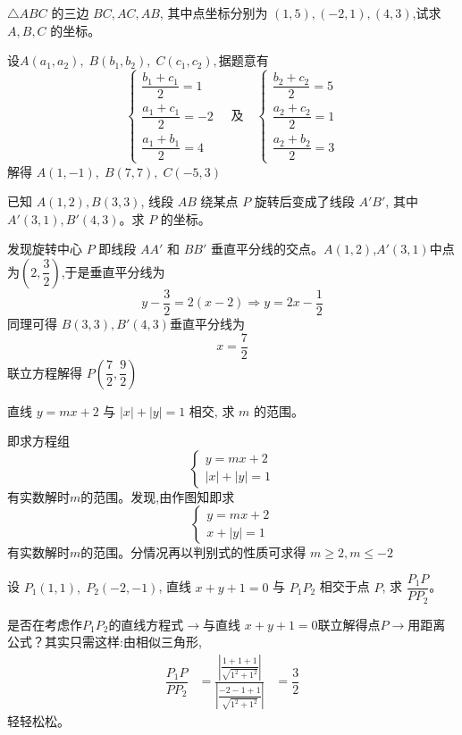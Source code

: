 \begin{questions}
    \question $\triangle ABC$ 的三边 $BC, AC, AB$, 其中点坐标分别为 $(1,5),(-2,1),(4,3)$,试求 $A, B, C$ 的坐标。
    \begin{solution}
        设$A(a_1,a_2),\; B(b_1,b_2),\; C(c_1,c_2),$据题意有
        \[
        \begin{cases}
        \dfrac{b_1+c_1}{2}=1 \\[6pt] \dfrac{a_1+c_1}{2}=-2 \\[6pt] \dfrac{a_1+b_1}{2}=4
        \end{cases}
        \quad
        \text{及}
        \quad
        \begin{cases}
        \dfrac{b_2+c_2}{2}=5 \\[6pt] \dfrac{a_2+c_2}{2}=1 \\[6pt] \dfrac{a_2+b_2}{2}=3
        \end{cases}
        \]
        解得 $A(1,-1),\; B(7,7),\; C(-5,3)$
    \end{solution}

    \question 已知 $A(1,2),B(3,3)$, 线段 $AB$ 绕某点 $P$ 旋转后变成了线段 $A'B'$, 其中 $A'(3,1),B'(4,3)$。求 $P$ 的坐标。
    \begin{solution}
        发现旋转中心 $P$ 即线段 $AA'$ 和 $BB'$ 垂直平分线的交点。$A(1,2)$,$A'(3,1)$中点为$\left(2,\dfrac{3}{2}\right)$,于是垂直平分线为 
        \[
        y - \frac{3}{2} = 2(x - 2) \Rightarrow y = 2x - \frac{1}{2}
        \] 
        同理可得 $B(3,3),B'(4,3)$垂直平分线为
        \[
        x = \frac{7}{2}
        \] 
        联立方程解得 $P\left( \dfrac{7}{2}, \dfrac{9}{2} \right)$
    \end{solution}
    
    \question 直线 $y = mx + 2$ 与 $|x| + |y| = 1$ 相交, 求 $m$ 的范围。
    \begin{solution}
        即求方程组 
        \[
        \begin{cases}
        y = mx + 2 \\ |x| + |y| = 1
        \end{cases}
        \]
        有实数解时$m$的范围。发现,由作图知即求\[
        \begin{cases}
        y = mx + 2 \\ x + |y| = 1
        \end{cases}
        \]有实数解时$m$的范围。分情况再以判别式的性质可求得 $m \ge 2 , m \le -2$
    \end{solution}
          
    \question 设 $P_1(1,1),\; P_2(-2,-1)$, 直线 $x + y + 1 = 0$ 与 $P_1P_2$ 相交于点 $P$, 求 $\dfrac{P_1P}{PP_2}$。
    \begin{solution}
        是否在考虑作$P_1P_2$的直线方程式$\rightarrow$与直线 $x + y + 1 = 0$联立解得点$P\rightarrow$用距离公式？其实只需这样:由相似三角形,
        \[
        \begin{aligned}
        \dfrac{P_1P}{PP_2} 
        &= \frac{\left|\dfrac{1+1+1}{\sqrt{1^2+1^2}}\right|}{\left|\dfrac{-2-1+1}{\sqrt{1^2+1^2}}\right|}
        &= \dfrac{3}{2}
        \end{aligned}
        \]轻轻松松。
    \end{solution}
    

\end{questions}
